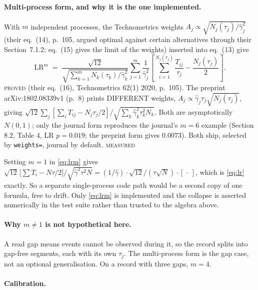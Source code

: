 \documentclass[11pt,a4paper]{article}
\newcommand{\gh}{\hat\gamma}
\newcommand{\PROVED}{\textsc{\textcolor{blue!55!black}{proved}}}
\newcommand{\MEASURED}{\textsc{\textcolor{green!45!black}{measured}}}
\begin{document}
\paragraph{Multi-process form, and why it is the one implemented.} With $m$ independent
processes, the Technometrics weights $A_j \propto \sqrt{N_j(\tau_j)/\gh_j^2}$ (their
eq.~(14), p.~105, argued optimal against certain alternatives through their Section~7.1.2;
eq.~(15) gives the limit of the weights) inserted into eq.~(13) give
%
\begin{equation}
\mathrm{LR}^m \;=\;
\frac{\sqrt{12}}{\sqrt{\sum_{k=1}^{m}N_k(\tau_k)/\gh_k^2}}
\sum_{j=1}^{m}\frac{1}{\gh_j^2}\left[\sum_{i=1}^{N_j(\tau_j)} \frac{T_{ij}}{\tau_j}
- \frac{N_j(\tau_j)}{2}\right].
\label{eq:lrm}
\end{equation}
\PROVED{} (their eq.~(16), Technometrics 62(1) 2020, p.~105). The preprint
arXiv:1802.08339v1 (p.~8) prints DIFFERENT weights, $A_j \propto \gh_j \tau_j
\sqrt{N_j(\tau_j)}$, giving $\sqrt{12}\sum_j[\sum_i T_{ij} - N_j\tau_j/2] /
\sqrt{\sum_k \gh_k^2\tau_k^2 N_k}$. Both are asymptotically $N(0,1)$; only the journal
form reproduces the journal's $m = 6$ example (Section 8.2, Table 4, LR $p = 0.019$;
the preprint form gives $0.0073$). Both ship, selected by \texttt{weights=}, journal
by default. \MEASURED

Setting $m = 1$ in \eqref{eq:lrm} gives
$\sqrt{12}\,\bigl[\textstyle\sum T_i - N\tau/2\bigr] \big/ \sqrt{\gh^2\tau^2 N}
= (1/\gh)\cdot\sqrt{12}/(\tau\sqrt{N})\cdot[\,\cdot\,]$, which is \eqref{eq:lr}
exactly. So a separate single-process code path would be a second copy of one formula,
free to drift. Only \eqref{eq:lrm} is implemented and the collapse is asserted
numerically in the test suite rather than trusted to the algebra above.

\paragraph{Why $m \neq 1$ is not hypothetical here.} A read gap means events cannot be
observed during it, so the record splits into gap-free segments, each with its own
$\tau_j$. The multi-process form is the gap case, not an optional generalisation. On a
record with three gaps, $m = 4$.

\paragraph{Calibration.}
\end{document}
